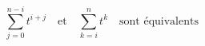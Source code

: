 \documentclass{amsart}
\begin{document}
  \pagestyle{empty}

  \begin{equation*}
    \sum_{j=0}^{n-i} {t}^{i+j} \quad \text{et} \quad \sum_{k=i}^{n} {t}^{k} \quad \text{sont équivalents}
  \end{equation*}
\end{document}
